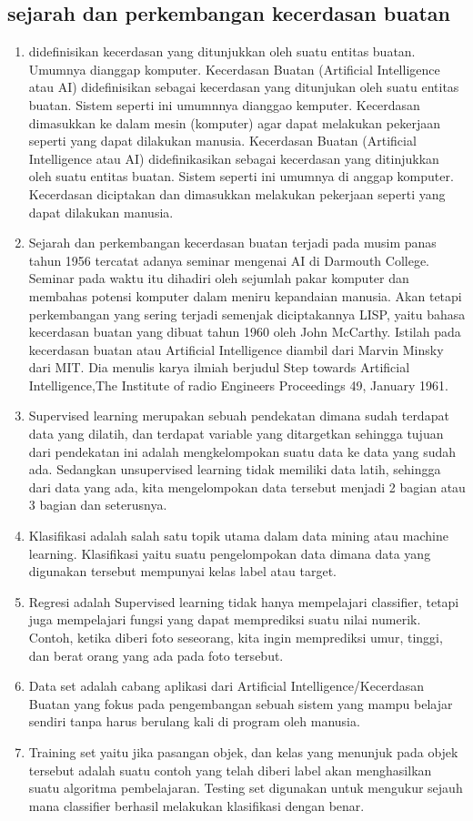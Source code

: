 \subsection{sejarah dan perkembangan kecerdasan buatan}
\begin{enumerate}
\item didefinisikan  kecerdasan yang ditunjukkan oleh suatu entitas buatan. Umumnya dianggap komputer. Kecerdasan Buatan (Artificial Intelligence atau AI) didefinisikan sebagai kecerdasan yang ditunjukan oleh suatu entitas buatan. Sistem seperti ini umumnnya dianggao kemputer. Kecerdasan dimasukkan ke dalam mesin (komputer) agar dapat melakukan pekerjaan seperti yang dapat dilakukan manusia. Kecerdasan Buatan (Artificial Intelligence atau AI) didefinikasikan sebagai kecerdasan yang ditinjukkan oleh suatu entitas buatan. Sistem seperti ini umumnya di anggap komputer. Kecerdasan diciptakan dan dimasukkan melakukan pekerjaan seperti yang dapat dilakukan manusia. 
\item Sejarah dan perkembangan kecerdasan buatan terjadi pada musim panas tahun 1956 tercatat adanya seminar mengenai AI di Darmouth College. Seminar pada waktu itu dihadiri oleh sejumlah pakar komputer dan membahas potensi komputer dalam meniru 
kepandaian manusia. Akan tetapi perkembangan yang sering terjadi semenjak diciptakannya LISP, yaitu bahasa kecerdasan buatan yang dibuat tahun 1960 oleh John McCarthy. Istilah pada kecerdasan buatan atau Artificial Intelligence diambil dari Marvin Minsky dari MIT. Dia menulis karya ilmiah berjudul Step towards Artificial Intelligence,The Institute of radio Engineers Proceedings 49, January 1961\cite{nasution2012implementasi}.
\item Supervised learning merupakan sebuah pendekatan dimana sudah terdapat data yang dilatih, dan terdapat variable yang ditargetkan sehingga tujuan dari pendekatan ini adalah mengkelompokan suatu data ke data yang sudah ada. Sedangkan unsupervised 
learning tidak memiliki data latih, sehingga dari data yang ada, kita mengelompokan data tersebut menjadi 2 bagian atau 3 bagian dan seterusnya.
\item Klasifikasi adalah salah satu topik utama dalam data mining atau machine learning. Klasifikasi yaitu suatu pengelompokan data dimana data yang digunakan tersebut mempunyai kelas label atau target.
\item Regresi adalah Supervised learning tidak hanya mempelajari classifier, tetapi juga mempelajari fungsi yang dapat memprediksi suatu nilai numerik. Contoh, ketika diberi foto seseorang, kita ingin memprediksi umur, tinggi, dan berat orang yang ada pada foto tersebut.
\item Data set adalah cabang aplikasi dari Artificial Intelligence/Kecerdasan Buatan yang fokus pada pengembangan sebuah sistem yang mampu belajar sendiri tanpa harus berulang kali di program oleh manusia.
\item Training set yaitu jika pasangan objek, dan kelas yang menunjuk pada objek tersebut adalah suatu contoh yang telah diberi label akan menghasilkan suatu algoritma pembelajaran.
\subitem Testing set digunakan untuk mengukur sejauh mana classifier berhasil melakukan klasifikasi dengan benar\cite{darujati2012pemanfaatan}.
\end{enumerate}
